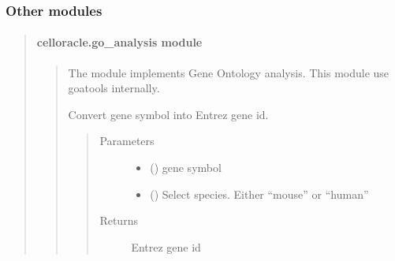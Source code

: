 \documentclass[letterpaper,10pt,english]{sphinxmanual}
\begin{document}
\subsubsection{Other modules}
\label{\detokenize{modules/celloracle:other-modules}}\begin{quote}


\paragraph{celloracle.go\_analysis module}
\label{\detokenize{modules/celloracle.go_analysis:celloracle-go-analysis-module}}\label{\detokenize{modules/celloracle.go_analysis::doc}}\begin{quote}
\label{\detokenize{modules/celloracle.go_analysis:module-celloracle.go_analysis}}
The {\hyperref[\detokenize{modules/celloracle.go_analysis:module-celloracle.go_analysis}]{}} module implements Gene Ontology analysis.
This module use goatools internally.

\begin{fulllineitems}
\label{\detokenize{modules/celloracle.go_analysis:celloracle.go_analysis.geneSymbol2ID}}
Convert gene symbol into Entrez gene id.
\begin{quote}\begin{description}
\item[{Parameters}] \leavevmode\begin{itemize}
\item {} 
 () \textendash{} gene symbol

\item {} 
 () \textendash{} Select species. Either “mouse” or “human”

\end{itemize}

\item[{Returns}] \leavevmode
Entrez gene id


\end{description}
\end{quote}
\end{fulllineitems}
\end{quote}
\end{quote}
\end{document}
